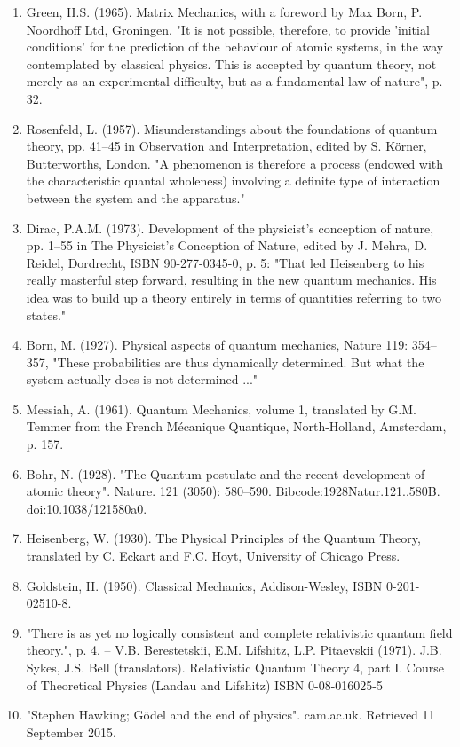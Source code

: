 \begin{enumerate}
\item Green, H.S. (1965). Matrix Mechanics, with a foreword by Max Born, P. Noordhoff Ltd, Groningen. "It is not possible, therefore, to provide 'initial conditions' for the prediction of the behaviour of atomic systems, in the way contemplated by classical physics. This is accepted by quantum theory, not merely as an experimental difficulty, but as a fundamental law of nature", p. 32.
\item Rosenfeld, L. (1957). Misunderstandings about the foundations of quantum theory, pp. 41–45 in Observation and Interpretation, edited by S. Körner, Butterworths, London. "A phenomenon is therefore a process (endowed with the characteristic quantal wholeness) involving a definite type of interaction between the system and the apparatus."
\item Dirac, P.A.M. (1973). Development of the physicist's conception of nature, pp. 1–55 in The Physicist's Conception of Nature, edited by J. Mehra, D. Reidel, Dordrecht, ISBN 90-277-0345-0, p. 5: "That led Heisenberg to his really masterful step forward, resulting in the new quantum mechanics. His idea was to build up a theory entirely in terms of quantities referring to two states."
\item Born, M. (1927). Physical aspects of quantum mechanics, Nature 119: 354–357, "These probabilities are thus dynamically determined. But what the system actually does is not determined ..."
\item Messiah, A. (1961). Quantum Mechanics, volume 1, translated by G.M. Temmer from the French Mécanique Quantique, North-Holland, Amsterdam, p. 157.
\item Bohr, N. (1928). "The Quantum postulate and the recent development of atomic theory". Nature. 121 (3050): 580–590. Bibcode:1928Natur.121..580B. doi:10.1038/121580a0.
\item Heisenberg, W. (1930). The Physical Principles of the Quantum Theory, translated by C. Eckart and F.C. Hoyt, University of Chicago Press.
\item Goldstein, H. (1950). Classical Mechanics, Addison-Wesley, ISBN 0-201-02510-8.
\item "There is as yet no logically consistent and complete relativistic quantum field theory.", p. 4.   – V.B. Berestetskii, E.M. Lifshitz, L.P. Pitaevskii (1971). J.B. Sykes, J.S. Bell (translators). Relativistic Quantum Theory 4, part I. Course of Theoretical Physics (Landau and Lifshitz) ISBN 0-08-016025-5
\item "Stephen Hawking; Gödel and the end of physics". cam.ac.uk. Retrieved 11 September 2015.

\end{enumerate}

